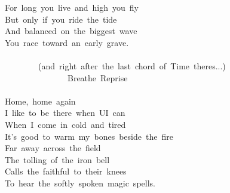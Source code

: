 {For\ long\ you\ live\ and\ high\ you\ fly\\
But\ only\ if\ you\ ride\ the\ tide\\
And\ balanced\ on\ the\ biggest\ wave\\
You\ race\ toward\ an\ early\ grave.\\
\\
\ \ \ \ \ \ \ \ (and\ right\ after\ the\ last\ chord\ of\ \;Time\;\ theres...)\\
\ \ \ \ \ \ \ \ \ \ \ \ \ \ \ Breathe\ Reprise\\
\\
Home,\ home\ again\\
I\ like\ to\ be\ there\ when\ UI\ can\\
When\ I\ come\ in\ cold\ and\ tired\\
It's\ good\ to\ warm\ my\ bones\ beside\ the\ fire\\
Far\ away\ across\ the\ field\\
The\ tolling\ of\ the\ iron\ bell\\
Calls\ the\ faithful\ to\ their\ knees\\
To\ hear\ the\ softly\ spoken\ magic\ spells.}
